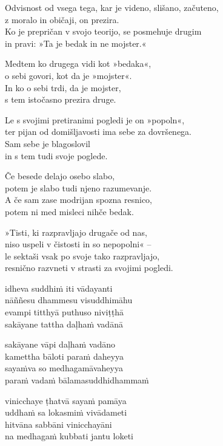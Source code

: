 
\clearpage

Odvisnost od vsega tega, kar je videno, slišano, začuteno,\\
z moralo in običaji, on prezira.\\
Ko je prepričan v svojo teorijo, se posmehuje drugim\\
in pravi: »Ta je bedak in ne mojster.«

Medtem ko drugega vidi kot »bedaka«,\\
o sebi govori, kot da je »mojster«.\\
In ko o sebi trdi, da je mojster,\\
s tem istočasno prezira druge.

Le s svojimi pretiranimi pogledi je on »popoln«,\\
ter pijan od domišljavosti ima sebe za dovršenega.\\
Sam sebe je blagoslovil\\
in s tem tudi svoje poglede.

Če besede delajo osebo slabo,\\
potem je slabo tudi njeno razumevanje.\\
A če sam zase modrijan spozna resnico,\\
potem ni med misleci nihče bedak.

»Tisti, ki razpravljajo drugače od nas,\\
niso uspeli v čistosti in so nepopolni« --\\
le sektaši vsak po svoje tako razpravljajo,\\
resnično razvneti v strasti za svojimi pogledi.


\clearpage

idheva suddhiṁ iti vādayanti\\
nāññesu dhammesu visuddhimāhu\\
evampi titthyā puthuso niviṭṭhā\\
sakāyane tattha daḷhaṁ vadānā

sakāyane vāpi daḷhaṁ vadāno\\
kamettha bāloti paraṁ daheyya\\
sayaṁva so medhagamāvaheyya\\
paraṁ vadaṁ bālamasuddhidhammaṁ

vinicchaye ṭhatvā sayaṁ pamāya\\
uddhaṁ sa lokasmiṁ vivādameti\\
hitvāna sabbāni vinicchayāni\\
na medhagaṁ kubbati jantu loketi

